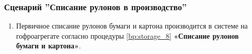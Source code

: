 


\subsubsection{Сценарий ''Списание рулонов в производство''}
\label{bp:production_10}

\begin{enumerate}
\item Первичное списание рулонов бумаги и картона производится  в системе \gofro на гофроагрегате согласно процедуры \ref{bp:storage_8} \textbf{«Списание рулонов бумаги и картона»}.
\end{enumerate}



\begin{comment} %


\subsubsection{Сценарий ''Производство продукции на линиях переработки c подключаемым оборудованием''}
\label{bp:production_20}

\begin{enumerate}
\item \operator на линии переработки заносит в системе \gofro выработку по каждому из станков и каждому переделу.
\item \operator создает в системе \gofro новый документ \myobject{ВыработкаПоПереработке}, указывает  бригаду и смену. Если документ был создан заранее \planner, то открывает его.
\item \operator нажимает кнопку \myform{ЗаполнитьПоПлану} в документе \myobject{ВыработкаПоПереработке}. Система \gofro отображает пользователю из плана список заданий на указанный станок, которые запланировал \planner. 
\item Система \gofro заполняет документ списком запланированных к выпуску заказов, оставляя пустыми колонки с фактическими объемами.
\item \operator	При необходимости  в системе \gofro  нажимает кнопку \myform{ТК} для вывода на экран технологической карты по выпускаемому заказу (-ам). Система \gofro откроет технологическую карту в печатном виде.
\item При необходимости \operator в системе \gofro печатает внутренние бирки (для полуфабрикатов) по команде \myform{БиркаВнутрицеховая}. Бирки можно распечатать как для всех позиций выработки, так и для выделенных строк. Данные о контрагенте и характеристики изделия заполняются автоматически.
\item \operator  в системе \gofro по команде \myform{Бирка} печатает бирки на готовую продукцию. %
Система \gofro формирует список номеров паллет. Система \gofro по команде \myform{Печать}
\ifnum\IsScancode=1
   выводит на печать форму бирки с штрих-кодом, 
   содержащим уникальный номер паллеты.
\else
   выводит на печать форму бирки на готовую продукцию. 
\fi



\end{comment}
